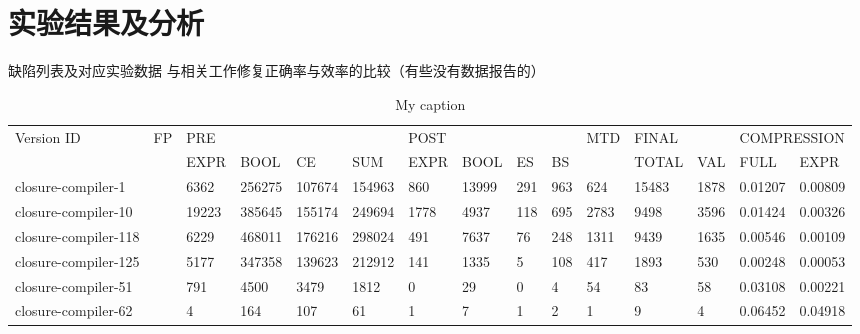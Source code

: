 \section{实验结果及分析}%
缺陷列表及对应实验数据
与相关工作修复正确率与效率的比较（有些没有数据报告的）
\begin{landscape}
\begin{table}[]
	\centering
	\caption{My caption}
	\label{my-label}
	\begin{tabular}{|l|l|l|l|l|l|l|l|l|l|l|l|l|l|l|}
		\hline
		\multirow{2}{*}{Version ID} & \multirow{2}{*}{FP} & \multicolumn{4}{l|}{PRE}         & \multicolumn{4}{l|}{POST} & \multirow{2}{*}{MTD} & \multicolumn{2}{l|}{FINAL} & \multicolumn{2}{l|}{COMPRESSION} \\ \cline{3-10} \cline{12-15} 
		&                     & EXPR  & BOOL   & CE     & SUM    & EXPR  & BOOL  & ES  & BS  &                         & TOTAL        & VAL         & FULL            & EXPR           \\ \hline
		closure-compiler-1          &                     & 6362  & 256275 & 107674 & 154963 & 860   & 13999 & 291 & 963 & 624                     & 15483        & 1878        & 0.01207         & 0.00809        \\ \hline
		closure-compiler-10         &                     & 19223 & 385645 & 155174 & 249694 & 1778  & 4937  & 118 & 695 & 2783                    & 9498         & 3596        & 0.01424         & 0.00326        \\ \hline
		closure-compiler-118        &                     & 6229  & 468011 & 176216 & 298024 & 491   & 7637  & 76  & 248 & 1311                    & 9439         & 1635        & 0.00546         & 0.00109        \\ \hline
		closure-compiler-125        &                     & 5177  & 347358 & 139623 & 212912 & 141   & 1335  & 5   & 108 & 417                     & 1893         & 530         & 0.00248         & 0.00053        \\ \hline
		closure-compiler-51         &                     & 791   & 4500   & 3479   & 1812   & 0     & 29    & 0   & 4   & 54                      & 83           & 58          & 0.03108         & 0.00221        \\ \hline
		closure-compiler-62         &                     & 4     & 164    & 107    & 61     & 1     & 7     & 1   & 2   & 1                       & 9            & 4           & 0.06452         & 0.04918        \\ \hline

\end{tabular}
\end{table}
\end{landscape}
